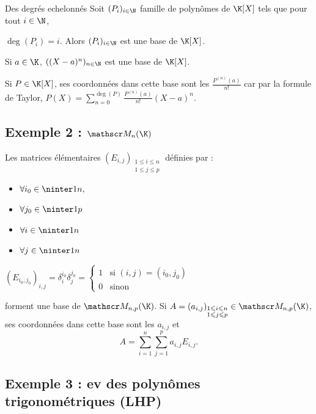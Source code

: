 \begin{theoreme}{Des degrés echelonnés}{}
    Soit $(P_i)_{i \in \N}$ famille de polynômes de $\K[X]$ tels que pour tout $i \in \N$,

    $\deg(P_i) = i$. Alors $(P_i)_{i \in \N}$ est une base de $\K[X]$.
\end{theoreme}



\begin{exemple}
    Si $a \in \K$, $((X - a)^n)_{n \in \N}$ est une base de $\K[X]$.

    Si $P \in \K[X]$, ses coordonnées dans cette base sont les $\frac{P^{(n)}(a)}{n!}$ 
    car par la formule de Taylor, $\displaystyle P(X) = \sum_{n=0}^{\deg(P)} \frac{P^{(n)}(a)}{n!} (X - a)^n$. 
\end{exemple}

\subsection{Exemple 2 : \texorpdfstring{$\mathscr M_n(\K)$}{Mn(K)}}

Les matrices élémentaires $(E_{i,j})_{\substack{1 \leqslant i \leqslant n \\ 1 \leqslant j \leqslant p}}$ 
définies par : 

\begin{itemize}
    \item $\forall i_0 \in \ninter 1 n,$
    \item $\forall j_0 \in \ninter 1 p $ 
    \item $\forall i \in \ninter 1 n $ 
    \item $\forall j \in \ninter 1 n$  
\end{itemize}

$(E_{i_0, j_0})_{i,j} = \delta_i^{i_0} \delta_j^{j_0} = \begin{cases}
    1 & \text{si } (i,j) = (i_0, j_0) \\
    0 & \text{sinon}
\end{cases}$

forment une base de $\mathscr M_{n, p}(\K)$. Si $A = (a_{i, j})_{\substack{1 \leqslant i \leqslant n \\ 1 \leqslant j \leqslant p}} \in \mathscr M_{n, p}(\K)$, 
ses coordonnées dans cette base sont les $a_{i, j}$ et 
$$A = \sum_{i=1}^n \sum_{j=1}^p a_{i, j} E_{i, j}.$$


\subsection{Exemple 3 : ev des polynômes trigonométriques (LHP)}

